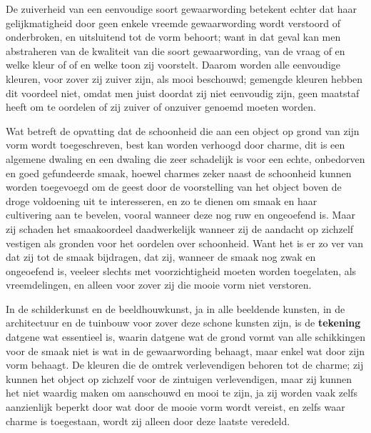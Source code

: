 De zuiverheid van een eenvoudige soort gewaarwording betekent echter dat haar gelijkmatigheid door geen enkele vreemde gewaarwording wordt verstoord of onderbroken, en uitsluitend tot de vorm behoort; want in dat geval kan men abstraheren van de kwaliteit van die soort gewaarwording, van de vraag of en welke kleur of of en welke toon zij voorstelt. Daarom worden alle eenvoudige kleuren, voor zover zij zuiver zijn, als mooi beschouwd; gemengde kleuren hebben dit voordeel niet, omdat men juist doordat zij niet eenvoudig zijn, geen maatstaf heeft om te oordelen of zij zuiver of onzuiver genoemd moeten worden.

Wat betreft de opvatting dat de schoonheid die aan een object op grond van zijn vorm wordt toegeschreven, best kan worden verhoogd door charme, dit is een algemene dwaling en een dwaling die zeer schadelijk is voor een echte, onbedorven en goed gefundeerde smaak, hoewel charmes zeker naast de schoonheid kunnen worden toegevoegd om de geest door de voorstelling van het object boven de droge voldoening uit te interesseren, en zo te dienen om smaak en haar cultivering aan te bevelen, vooral wanneer deze nog ruw en ongeoefend is. Maar zij schaden het smaakoordeel daadwerkelijk wanneer zij de aandacht op zichzelf vestigen als gronden voor het oordelen over schoonheid. Want het is er zo ver van dat zij tot de smaak bijdragen, dat zij, wanneer de smaak nog zwak en ongeoefend is, veeleer slechts met voorzichtigheid moeten worden toegelaten, als vreemdelingen, en alleen voor zover zij die mooie vorm niet verstoren.

In de schilderkunst en de beeldhouwkunst, ja in alle beeldende kunsten, in de architectuur en de tuinbouw voor zover deze schone kunsten zijn, is de \textbf{tekening} datgene wat essentieel is, waarin datgene wat de grond vormt van alle schikkingen voor de smaak niet is wat in de gewaarwording behaagt, maar enkel wat door zijn vorm behaagt. De kleuren die de omtrek verlevendigen behoren tot de charme; zij kunnen het object op zichzelf voor de zintuigen verlevendigen, maar zij kunnen het niet waardig maken om aanschouwd en mooi te zijn, ja zij worden vaak zelfs aanzienlijk beperkt door wat door de mooie vorm wordt vereist, en zelfs waar charme is toegestaan, wordt zij alleen door deze laatste veredeld.

